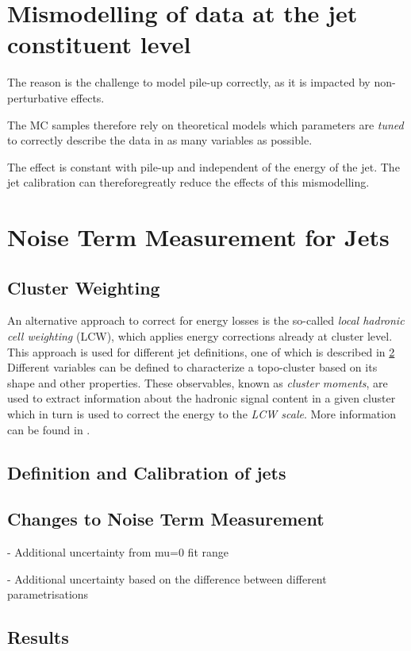 \chapter{Mismodelling of data at the jet constituent level}
\label{app:constituents-mismodelling}

The reason is the challenge to model pile-up correctly, as it is impacted by non-perturbative effects.

The MC samples therefore rely on theoretical models which parameters are \emph{tuned} to correctly describe the data in as many variables as possible.

The effect is constant with pile-up and independent of the energy of the jet. The jet calibration can thereforegreatly reduce the effects of this mismodelling.


\chapter{Noise Term Measurement for \Rscan Jets}
\label{app:noise-term-rscan}


\section{Cluster Weighting}
An alternative approach to correct for energy losses is the so-called \emph{local hadronic cell weighting} (LCW), which applies energy corrections already at cluster level.
This approach is used for different jet definitions, one of which is described in \cref{app:noise-term-rscan}
Different variables can be defined to characterize a topo-cluster based on its shape and other properties. These observables, known as \emph{cluster moments}, are used to extract information about the hadronic signal content in a given cluster which in turn is used to correct the energy to the \emph{LCW scale}. More information can be found in .

\section{Definition and Calibration of \Rscan jets}

\section{Changes to Noise Term Measurement}

- Additional uncertainty from mu=0 fit range

- Additional uncertainty based on the difference between different parametrisations


\section{Results}

